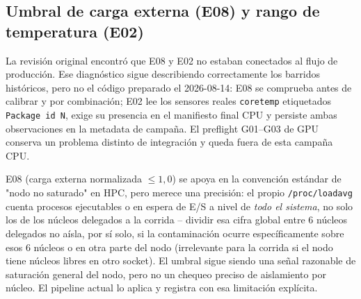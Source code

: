 \subsection{Umbral de carga externa (E08) y rango de temperatura (E02)}

La revisión original encontró que E08 y E02 no estaban conectados al flujo
de producción. Ese diagnóstico sigue describiendo correctamente los
barridos históricos, pero no el código preparado el 2026-08-14: E08 se
comprueba antes de calibrar y por combinación; E02 lee los sensores reales
\texttt{coretemp} etiquetados \texttt{Package id N}, exige su presencia en
el manifiesto final CPU y persiste ambas observaciones en la metadata de
campaña. El preflight G01--G03 de GPU conserva un problema distinto de
integración y queda fuera de esta campaña CPU.

E08 (carga externa normalizada $\leq 1{,}0$) se apoya en la convención
estándar de "nodo no saturado" en HPC, pero merece una precisión: el
propio \texttt{/proc/loadavg} cuenta procesos ejecutables o en espera de
E/S a nivel de \emph{todo el sistema}, no solo los de los núcleos
delegados a la corrida -- dividir esa cifra global entre 6 núcleos
delegados no aísla, por sí solo, si la contaminación ocurre específicamente
sobre esos 6 núcleos o en otra parte del nodo (irrelevante para la corrida
si el nodo tiene núcleos libres en otro socket). El umbral sigue siendo una
señal razonable de saturación general del nodo, pero no un chequeo preciso
de aislamiento por núcleo. El pipeline actual lo aplica y registra con esa
limitación explícita.

